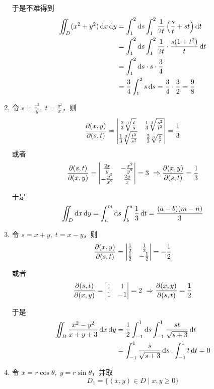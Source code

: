 \begin{solution}
\begin{enumerate}
        于是不难得到
        \begin{align*}
        \iint_D (x^2 + y^2) \dif x \dif y 
        &= \int_1^2 \dif s \int_1^2 \frac{1}{2t} \left( \frac{s}{t} + st \right) \dif t \\
        &= \int_1^2 \dif s \int_1^2 \frac{1}{2t} \cdot \frac{s(1 + t^2)}{t} \dif t \\
        &= \int_1^2 \dif s \cdot s \cdot \frac{3}{4} \\
        &= \frac{3}{4} \int_1^2 s \dif s = \frac{3}{4} \cdot \frac{3}{2} = \frac{9}{8}
        \end{align*}
        \item 令 $s = \frac{x^2}{y},\; t = \frac{y^2}{x}$，则
        \[
        \pdv{(x, y)}{(s, t)} = 
        \begin{vmatrix}
        \frac{2}{3} \sqrt[3]{\frac{t}{s}} & \frac{1}{3} \sqrt[3]{\frac{s^2}{t^2}} \\
        \frac{1}{3} \sqrt[3]{\frac{t^2}{s^2}} & \frac{2}{3} \sqrt[3]{\frac{s}{t}} \\
        \end{vmatrix}
        = \frac{1}{3}
        \]
        或者
        $$
        \pdv{(s,t)}{(x,y)} =
        \begin{vmatrix}
            \frac{2x}{y} & -\frac{x^2}{y^2} \\
            -\frac{y^2}{x^2} & \frac{2y}{x}
        \end{vmatrix} = 3 \ \Rightarrow \pdv{(x,y)}{(s,t)} = \frac{1}{3}
        $$
        
        于是
        \[
        \iint_D \operatorname{d\!} x \operatorname{d\!} y = \int_n^m \operatorname{d\!} s \int_b^a \frac{1}{3} \operatorname{d\!} t 
        = \frac{(a - b)(m - n)}{3}
        \]
        \setcounter{enumi}{6}
        \item 令 $s = x + y,\; t = x - y$，则
        \[
        \pdv{(x, y)}{(s, t)} = 
        \begin{vmatrix}
        \frac{1}{2} & \frac{1}{2} \\
        \frac{1}{2} & -\frac{1}{2}
        \end{vmatrix}
        = -\frac{1}{2}
        \]

        或者
        $$
        \pdv{(s,t)}{(x,y)} =
        \begin{vmatrix}
            1 & 1 \\
            1 & -1
        \end{vmatrix} = 2 \ \Rightarrow \pdv{(x,y)}{(s,t)} = \frac{1}{2}
        $$
        
        于是
        \begin{align*}
        \iint_D \frac{x^2 - y^2}{x + y + 3} \operatorname{d\!} x \operatorname{d\!} y 
        &= \frac{1}{2} \int_{-1}^1 \operatorname{d\!} s \int_{-1}^1 \frac{st}{\sqrt{s + 3}} \operatorname{d\!} t \\
        &= \int_{-1}^1 \frac{s}{\sqrt{s + 3}} \operatorname{d\!} s \cdot \int_{-1}^1 t \operatorname{d\!} t = 0
        \end{align*}
        \setcounter{enumi}{8}
        \item 令 $x = r\cos\theta,\; y = r\sin\theta$，并取
        \[
        D_1 = \{(x, y) \in D \mid x, y \ge 0\}
        \]
        

\end{enumerate}
\end{solution}
